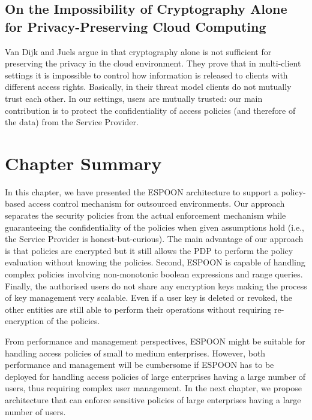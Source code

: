 \documentclass[epsfig,a4paper,11pt,titlepage]{book}
\numberwithin{algorithm}{chapter}
\begin{document}
\subsection[Impossibility of Cryptography Alone for Preserving Privacy]{On the Impossibility of Cryptography Alone for Privacy-Preserving Cloud Computing}
Van Dijk and Juels argue in \cite{VanDijk:2010} that cryptography alone is not sufficient for preserving the privacy in the cloud environment. They prove that in multi-client settings it is impossible to control how information is released to clients with different access rights. Basically, in their threat model clients do not mutually trust each other. In our settings, users are mutually trusted: our main contribution is to protect the confidentiality of access policies (and therefore of the data) from the Service Provider.


\section{Chapter Summary}
\label{sec:espoon-summary}
In this chapter, we have presented the \gls{ESPOON} architecture to support a policy-based access control mechanism for outsourced environments. Our approach separates the security policies from the actual enforcement mechanism while guaranteeing the confidentiality of the policies when given assumptions hold (i.e., the Service Provider is honest-but-curious). The main advantage of our approach is that policies are encrypted but it still allows the \gls{PDP} to perform the policy evaluation without knowing the policies. Second, \gls{ESPOON} is capable of handling complex policies involving non-monotonic boolean expressions and range queries. Finally, the authorised users do not share any encryption keys making the process of key management very scalable. Even if a user key is deleted or revoked, the other entities are still able to perform their operations without requiring re-encryption of the policies.

From performance and management perspectives, \gls{ESPOON} might be suitable for handling access policies of small to medium enterprises. However, both performance and management will be cumbersome if \gls{ESPOON} has to be deployed for handling access policies of large enterprises having a large number of users, thus requiring complex user management. In the next chapter, we propose architecture that can enforce sensitive policies of large enterprises having a large number of users.
\end{document}
